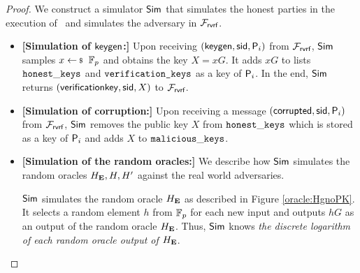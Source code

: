 \begin{proof}
	We construct a simulator $ \mathsf{Sim} $ that simulates the honest parties in the execution of \name \ and simulates the adversary in $ \mathcal{F}_{\textsf{rvrf}} $. 
	\begin{itemize}
		
		\item \textbf{[Simulation of $ \mathsf{keygen} $:]} Upon receiving $(\mathsf{keygen}, \textsf{sid}, \mathsf{P}_i)$ from $\mathcal{F}_{\textsf{rvrf}}$, $ \mathsf{Sim} $ samples $x \leftsample \FF_p$ and obtains the key $X = xG$. It adds $ xG $ to lists $ \mathtt{honest\_keys} $ and $ \texttt{verification\_keys} $ as a key of $ \mathsf{P}_i $. 
		In the end, $ \mathsf{Sim} $ returns $(\mathsf{verificationkey}, \textsf{sid}, X)$ to $\mathcal{F}_{\textsf{rvrf}}$. %
		
		\item \textbf{[Simulation of corruption:]} Upon receiving a message $ (\mathsf{corrupted}, \textsf{sid}, \mathsf{P}_i) $ from $ \mathcal{F}_{\textsf{rvrf}} $, $ \mathsf{Sim} $ removes the public key $ X $ from $ \mathtt{honest\_keys} $ which is stored as a key of $ \mathsf{P}_i $ and adds $ X $ to $ \mathtt{malicious\_keys} $.
		
		\item\textbf{[Simulation of the random oracles:]} We  describe how $ \mathsf{Sim} $ simulates the random oracles $ H_{\mathbf{E}}, H, H' $ against the real world adversaries. 	
		
		$ \mathsf{Sim} $ simulates the random oracle $ H_{\mathbf{E}} $ as described in Figure \ref{oracle:HgnoPK}. It selects a random element  $ h $ from $ \mathbb{F}_p $ for each new input and outputs $ hG $ as an output of the random oracle $ H_{\mathbf{E}} $. Thus, $ \mathsf{Sim} $ knows \emph{the discrete logarithm of each random oracle output of $H_{\mathbf{E}}  $}. 
		\begin{figure}
			\centering
			
			\noindent{}
\end{figure}
\end{itemize}
\end{proof}
